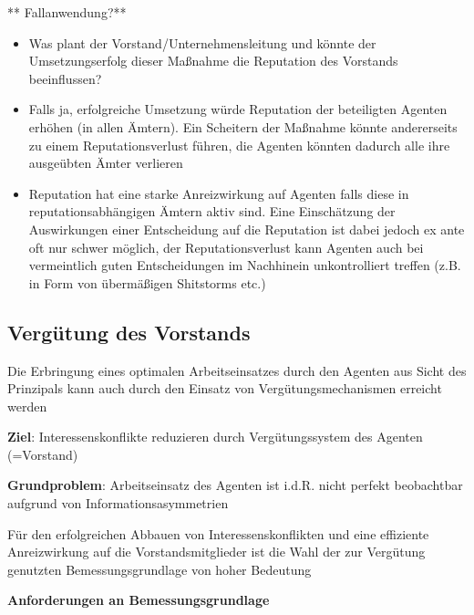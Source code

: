 \documentclass[
]{article}
\providecommand{\tightlist}{%
  \setlength{\itemsep}{0pt}\setlength{\parskip}{0pt}}
\begin{document}
** Fallanwendung?**

\begin{itemize}
\tightlist
\item
  Was plant der Vorstand/Unternehmensleitung und könnte der
  Umsetzungserfolg dieser Maßnahme die Reputation des Vorstands
  beeinflussen?
\item
  Falls ja, erfolgreiche Umsetzung würde Reputation der beteiligten
  Agenten erhöhen (in allen Ämtern). Ein Scheitern der Maßnahme könnte
  andererseits zu einem Reputationsverlust führen, die Agenten könnten
  dadurch alle ihre ausgeübten Ämter verlieren
\item
  Reputation hat eine starke Anreizwirkung auf Agenten falls diese in
  reputationsabhängigen Ämtern aktiv sind. Eine Einschätzung der
  Auswirkungen einer Entscheidung auf die Reputation ist dabei jedoch ex
  ante oft nur schwer möglich, der Reputationsverlust kann Agenten auch
  bei vermeintlich guten Entscheidungen im Nachhinein unkontrolliert
  treffen (z.B. in Form von übermäßigen Shitstorms etc.)
\end{itemize}

\hypertarget{verguxfctung-des-vorstands}{%
\subsection{Vergütung des Vorstands}\label{verguxfctung-des-vorstands}}

Die Erbringung eines optimalen Arbeitseinsatzes durch den Agenten aus
Sicht des Prinzipals kann auch durch den Einsatz von
Vergütungsmechanismen erreicht werden

\textbf{Ziel}: Interessenskonflikte reduzieren durch Vergütungssystem
des Agenten (=Vorstand)

\textbf{Grundproblem}: Arbeitseinsatz des Agenten ist i.d.R. nicht
perfekt beobachtbar aufgrund von Informationsasymmetrien

Für den erfolgreichen Abbauen von Interessenskonflikten und eine
effiziente Anreizwirkung auf die Vorstandsmitglieder ist die Wahl der
zur Vergütung genutzten Bemessungsgrundlage von hoher Bedeutung

\textbf{Anforderungen an Bemessungsgrundlage}
\end{document}
